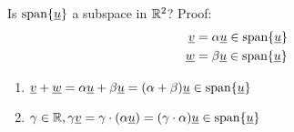 \begin{example}
Is $\text{span}\{\underline{u}\}$ a subspace in $\mathbb{R}^2$? Proof: 
\begin{align*}
\underline{v} &= \alpha\underline{u}\in\text{span}\{\underline{u}\}\\
\underline{w} &= \beta\underline{u}\in\text{span}\{\underline{u}\}\\
\end{align*}
\begin{enumerate}
\item $\underline{v}+\underline{w}=\alpha\underline{u}+\beta\underline{u}=(\alpha+\beta)\underline{u}\in\text{span}\{\underline{u}\}$
\item $\gamma\in\mathbb{R},\gamma\underline{v}=\gamma\cdot(\alpha\underline{u})=(\gamma\cdot\alpha)\underline{u}\in\text{span}\{\underline{u}\}$
\end{enumerate}

	
\end{example}


